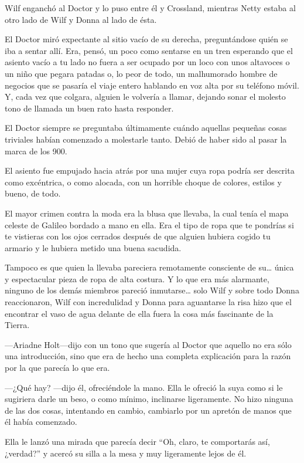 Wilf enganchó al Doctor y lo puso entre él y Crossland, mientras Netty
estaba al otro lado de Wilf y Donna al lado de ésta.

El Doctor miró expectante al sitio vacío de su derecha, preguntándose
quién se iba a sentar allí. Era, pensó, un poco como sentarse en un tren
esperando que el asiento vacío a tu lado no fuera a ser ocupado por un
loco con unos altavoces o un niño que pegara patadas o, lo peor de todo,
un malhumorado hombre de negocios que se pasaría el viaje entero
hablando en voz alta por su teléfono móvil. Y, cada vez que colgara,
alguien le volvería a llamar, dejando sonar el molesto tono de llamada
un buen rato hasta responder.

El Doctor siempre se preguntaba últimamente cuándo aquellas pequeñas
cosas triviales habían comenzado a molestarle tanto. Debió de haber sido
al pasar la marca de los 900.

El asiento fue empujado hacia atrás por una mujer cuya ropa podría ser
descrita como excéntrica, o como alocada, con un horrible choque de
colores, estilos y bueno, de todo.

El mayor crimen contra la moda era la blusa que llevaba, la cual tenía
el mapa celeste de Galileo bordado a mano en ella. Era el tipo de ropa
que te pondrías si te vistieras con los ojos cerrados después de que
alguien hubiera cogido tu armario y le hubiera metido una buena
sacudida.

Tampoco es que quien la llevaba pareciera remotamente consciente de
su\ldots{} única y espectacular pieza de ropa de alta costura. Y lo que
era más alarmante, ninguno de los demás miembros pareció
inmutarse\ldots{} solo Wilf y sobre todo Donna reaccionaron, Wilf con
incredulidad y Donna para aguantarse la risa hizo que el encontrar el
vaso de agua delante de ella fuera la cosa más fascinante de la Tierra.

---Ariadne Holt---dijo con un tono que sugería al Doctor que aquello no
era sólo una introducción, sino que era de hecho una completa
explicación para la razón por la que parecía lo que era.

---¿Qué hay? ---dijo él, ofreciéndole la mano. Ella le ofreció la suya
como si le sugiriera darle un beso, o como mínimo, inclinarse
ligeramente. No hizo ninguna de las dos cosas, intentando en cambio,
cambiarlo por un apretón de manos que él había comenzado.

Ella le lanzó una mirada que parecía decir ``Oh, claro, te comportarás
así, ¿verdad?'' y acercó su silla a la mesa y muy ligeramente lejos de
él.

